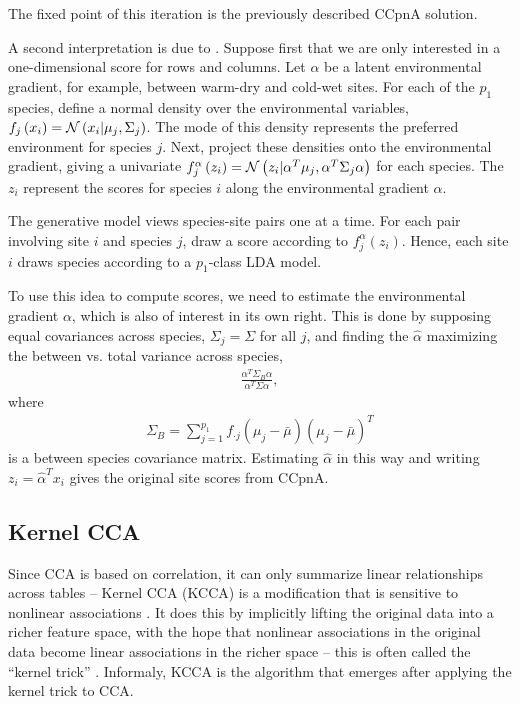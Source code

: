 \documentclass[14pt]{extarticle}
\begin{document}
The fixed point of this iteration is the previously described CCpnA solution.

A second interpretation is due to \cite{zhu2005constrained}. Suppose first that
we are only interested in a one-dimensional score for rows and columns. Let
$\alpha$ be a latent environmental gradient, for example, between warm-dry and
cold-wet sites. For each of the $p_{1}$ species, define a normal density over
the environmental variables, $f_{j}\left(x_{i}\right) = \mathcal{N}\left(x_i \vert
\mu_{j}, \Sigma_{j}\right)$. The mode of this density represents the preferred
environment for species $j$. Next, project these densities onto the
environmental gradient, giving a univariate $f_{j}^{\alpha}\left(z_{i}\right) =
\mathcal{N}\left(z_i \vert \alpha^{T}\mu_{j}, \alpha^{T} \Sigma_{j}\alpha\right)$ for
each species. The $z_{i}$ represent the scores for species $i$ along the
environmental gradient $\alpha$.

The generative model views species-site pairs one at a time. For each pair
involving site $i$ and species $j$, draw a score according to
$f_{j}^{\alpha}\left(z_{i}\right)$. Hence, each site $i$ draws species according
to a $p_{1}$-class LDA model.

To use this idea to compute scores, we need to estimate the environmental
gradient $\alpha$, which is also of interest in its own right. This is done by
supposing equal covariances across species, $\Sigma_{j} = \Sigma$ for all $j$,
and finding the $\hat{\alpha}$ maximizing the between vs. total variance across
species,
\begin{align*}
  \frac{\alpha^{T} \Sigma_{B} \alpha}{\alpha^{T} \Sigma \alpha},
\end{align*}
where
\begin{align*}
  \Sigma_{B} = \sum_{j = 1}^{p_{1}} f_{\cdot j}\left(\mu_{j} -
  \bar{\mu}\right)\left(\mu_{j} - \bar{\mu}\right)^{T}
\end{align*}
is a between species covariance matrix. Estimating $\hat{\alpha}$ in this way
and writing $z_{i} = \hat{\alpha}^{T}x_{i}$ gives the original site scores from
CCpnA.

\subsection{Kernel CCA}
\label{subsec:kernel_cca}

Since CCA is based on correlation, it can only summarize linear relationships
across tables -- Kernel CCA (KCCA) is a modification that is sensitive to
nonlinear associations \citep{akaho2006kernel, bach2003kernel,
  lanckriet2004statistical}. It does this by implicitly lifting the original
data into a richer feature space, with the hope that nonlinear associations in
the original data become linear associations in the richer space -- this is
often called the ``kernel trick'' \citep{scholkopf2001kernel}. Informaly, KCCA
is the algorithm that emerges after applying the kernel trick to CCA.
\end{document}
